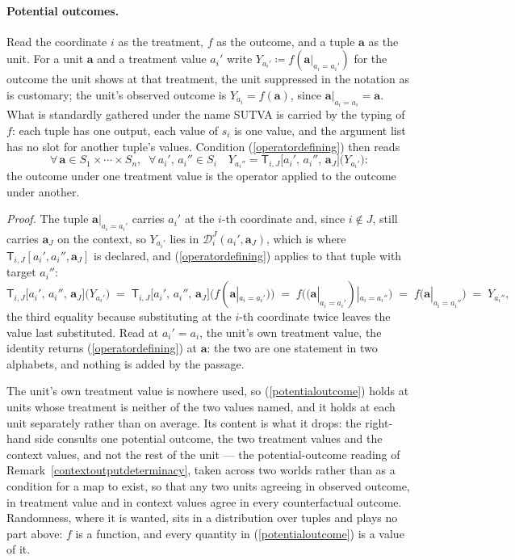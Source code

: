 \documentclass{article}
\theoremstyle{definition}
\theoremstyle{remark}
\begin{document}
\paragraph{Potential outcomes.} Read the coordinate $i$ as the treatment, $f$ as the outcome, and a tuple $\boldsymbol{a}$ as the unit. For a unit $\boldsymbol{a}$ and a treatment value $a_i'$ write $Y_{a_i'} \coloneqq f(\boldsymbol{a}|_{a_i = a_i'})$ for the outcome the unit shows at that treatment, the unit suppressed in the notation as is customary; the unit's observed outcome is $Y_{a_i} = f(\boldsymbol{a})$, since $\boldsymbol{a}|_{a_i = a_i} = \boldsymbol{a}$. What is standardly gathered under the name SUTVA is carried by the typing of $f$: each tuple has one output, each value of $s_i$ is one value, and the argument list has no slot for another tuple's values. Condition (\ref{operatordefining}) then reads
\begin{equation}
\label{potentialoutcome}
\forall\, \boldsymbol{a} \in S_1 \times \cdots \times S_n,\;\; \forall\, a_i',\, a_i'' \in S_i \quad
Y_{a_i''} = \mathsf{T}_{i,J}\bigl[a_i',\, a_i'',\, \boldsymbol{a}_J\bigr]\bigl(Y_{a_i'}\bigr) :
\end{equation}
the outcome under one treatment value is the operator applied to the outcome under another.

\noindent \textit{Proof.} The tuple $\boldsymbol{a}|_{a_i = a_i'}$ carries $a_i'$ at the $i$-th coordinate and, since $i \notin J$, still carries $\boldsymbol{a}_J$ on the context, so $Y_{a_i'}$ lies in $\mathcal{D}_i^J(a_i', \boldsymbol{a}_J)$, which is where $\mathsf{T}_{i,J}[a_i', a_i'', \boldsymbol{a}_J]$ is declared, and (\ref{operatordefining}) applies to that tuple with target $a_i''$:
\[
\mathsf{T}_{i,J}\bigl[a_i',\, a_i'',\, \boldsymbol{a}_J\bigr]\bigl(Y_{a_i'}\bigr)
\;=\; \mathsf{T}_{i,J}\bigl[a_i',\, a_i'',\, \boldsymbol{a}_J\bigr]\bigl(f(\boldsymbol{a}|_{a_i = a_i'})\bigr)
\;=\; f\bigl((\boldsymbol{a}|_{a_i = a_i'})|_{a_i = a_i''}\bigr)
\;=\; f\bigl(\boldsymbol{a}|_{a_i = a_i''}\bigr)
\;=\; Y_{a_i''},
\]
the third equality because substituting at the $i$-th coordinate twice leaves the value last substituted. Read at $a_i' = a_i$, the unit's own treatment value, the identity returns (\ref{operatordefining}) at $\boldsymbol{a}$: the two are one statement in two alphabets, and nothing is added by the passage.

\noindent The unit's own treatment value is nowhere used, so (\ref{potentialoutcome}) holds at units whose treatment is neither of the two values named, and it holds at each unit separately rather than on average. Its content is what it drops: the right-hand side consults one potential outcome, the two treatment values and the context values, and not the rest of the unit --- the potential-outcome reading of Remark~\ref{contextoutputdeterminacy}, taken across two worlds rather than as a condition for a map to exist, so that any two units agreeing in observed outcome, in treatment value and in context values agree in every counterfactual outcome. Randomness, where it is wanted, sits in a distribution over tuples and plays no part above: $f$ is a function, and every quantity in (\ref{potentialoutcome}) is a value of it.
\end{document}
